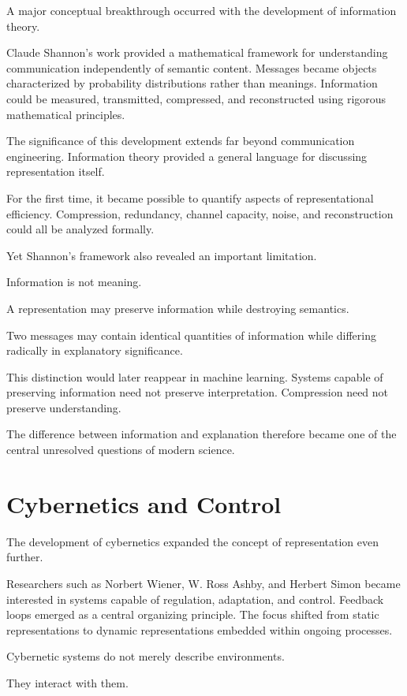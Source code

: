 \documentclass[11pt,oneside,openany]{book}
\begin{document}
A major conceptual breakthrough occurred with the development of information theory.

Claude Shannon's work provided a mathematical framework for understanding communication independently of semantic content. Messages became objects characterized by probability distributions rather than meanings. Information could be measured, transmitted, compressed, and reconstructed using rigorous mathematical principles.

The significance of this development extends far beyond communication engineering. Information theory provided a general language for discussing representation itself.

For the first time, it became possible to quantify aspects of representational efficiency. Compression, redundancy, channel capacity, noise, and reconstruction could all be analyzed formally.

Yet Shannon's framework also revealed an important limitation.

Information is not meaning.

A representation may preserve information while destroying semantics.

Two messages may contain identical quantities of information while differing radically in explanatory significance.

This distinction would later reappear in machine learning. Systems capable of preserving information need not preserve interpretation. Compression need not preserve understanding.

The difference between information and explanation therefore became one of the central unresolved questions of modern science.

\section{Cybernetics and Control}

The development of cybernetics expanded the concept of representation even further.

Researchers such as Norbert Wiener, W. Ross Ashby, and Herbert Simon became interested in systems capable of regulation, adaptation, and control. Feedback loops emerged as a central organizing principle. The focus shifted from static representations to dynamic representations embedded within ongoing processes.

Cybernetic systems do not merely describe environments.

They interact with them.
\end{document}

